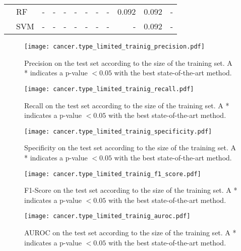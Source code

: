 \begin{sidewaystable}
\begin{tabular}{llrrrrrrrrrr}
		                       & RF                    & -             & -                    & -                 & -     & -           & -        & -     & 0.092    & 0.092    & -         \\
		                       & SVM                   & -             & -                    & -                 & -     & -           & -        & -     & -        & 0.092    & -         \\
		\bottomrule
	\end{tabular}
	\label{tab:pval_error_rate}
\end{sidewaystable}


\begin{figure}[htbp]
	\centering
	\texttt{[image: cancer.type\_limited\_trainig\_precision.pdf]}
	\caption{Precision on the test set according to the size of the training set.  A * indicates a p-value \(< 0.05\) with the best state-of-the-art method.}
	\label{fig:limit_train_classif_precision}
\end{figure}

\begin{figure}[htbp]
	\centering
	\texttt{[image: cancer.type\_limited\_trainig\_recall.pdf]}
	\caption{Recall on the test set according to the size of the training set.  A * indicates a p-value \(< 0.05\) with the best state-of-the-art method.}
	\label{fig:limit_train_classif_recall}
\end{figure}

\begin{figure}[htbp]
	\centering
	\texttt{[image: cancer.type\_limited\_trainig\_specificity.pdf]}
	\caption{Specificity on the test set according to the size of the training set.  A * indicates a p-value \(< 0.05\) with the best state-of-the-art method.}
	\label{fig:limit_train_classif_specificity}
\end{figure}

\begin{figure}[htbp]
	\centering
	\texttt{[image: cancer.type\_limited\_trainig\_f1\_score.pdf]}
	\caption{F1-Score on the test set according to the size of the training set.  A * indicates a p-value \(< 0.05\) with the best state-of-the-art method.}
	\label{fig:limit_train_classif_f1}
\end{figure}

\begin{figure}[htbp]
	\centering
	\texttt{[image: cancer.type\_limited\_trainig\_auroc.pdf]}
	\caption{AUROC on the test set according to the size of the training set.  A * indicates a p-value \(< 0.05\) with the best state-of-the-art method.}
	\label{fig:limit_train_classif_auroc}
\end{figure}

